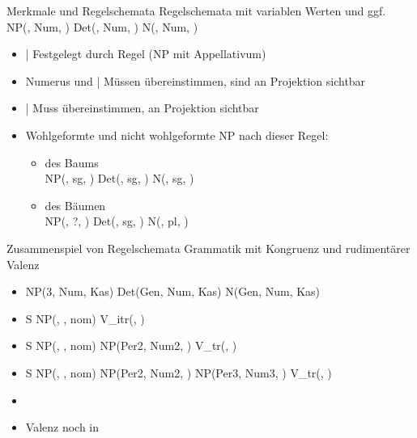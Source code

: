 \begin{frame}
  {Merkmale und Regelschemata}
  \onslide<+->
  \onslide<+->
  Regelschemata mit \alert{variablen Werten} und ggf.\ \\
  \onslide<+->
  \Zeile
  \centering 
  {\Large NP(, \alert{Num}, ) \goesto Det(, \alert{Num}, ) N(, \alert{Num}, ) }
  \Zeile
  \begin{itemize}[<+->]
    \item {} | Festgelegt durch Regel (NP mit Appellativum)
    \item \alert{Numerus} und  | Müssen übereinstimmen, sind an Projektion sichtbar
    \item {} | Muss übereinstimmen, an Projektion sichtbar
    \Zeile
    \item Wohlgeformte und nicht wohlgeformte NP nach dieser Regel:
      \Viertelzeile
      \begin{itemize}[<+->]
        \item des Baums \\
          NP(, \alert{sg}, ) \goesto Det(, \alert{sg}, ) N(, \alert{sg}, )
          \Viertelzeile
        \item des Bäumen \\
          NP(, \alert{?}, ) \goesto Det(, \alert{sg}, ) N(, \alert{pl}, )
      \end{itemize}
  \end{itemize}
\end{frame}


\begin{frame}
  {Zusammenspiel von Regelschemata}
  \onslide<+->
  \onslide<+->
  Grammatik mit Kongruenz und rudimentärer Valenz\\
  \Halbzeile
  \begin{itemize}[<+->]
    \item[ ] NP(3, Num, Kas) \goesto Det(Gen, Num, Kas) N(Gen, Num, Kas)
    \item[ ] S \goesto NP(, , \alert{nom}) V\_itr(, )
    \item[ ] S \goesto NP(, , \alert{nom}) NP(Per2, Num2, ) V\_tr(, )
    \item[ ] S \goesto NP(, , \alert{nom}) NP(Per2, Num2, ) NP(Per3, Num3, ) V\_tr(, )
  \end{itemize}
  \Zeile
  \begin{itemize}[<+->]
    \item {}
    \item \alert{Valenz noch in}  
  \end{itemize}
\end{frame}


